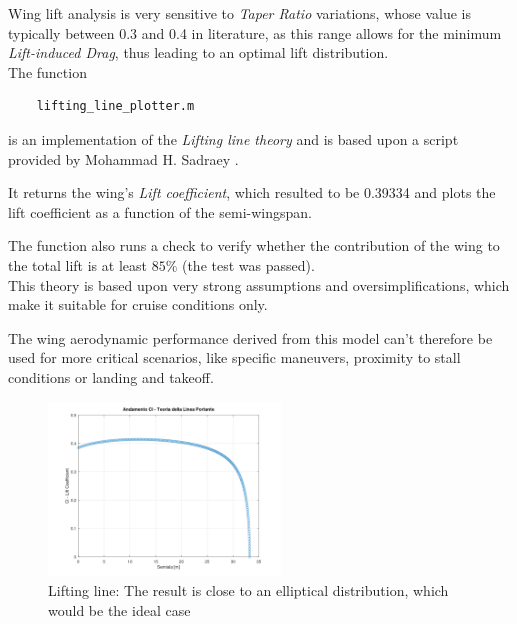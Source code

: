 \documentclass{article}
\begin{document}
Wing lift analysis is very sensitive to \textit{Taper Ratio} variations, whose value is typically between 
0.3 and 0.4 in literature, as this range allows for the minimum \textit{Lift-induced Drag}, thus leading to 
an optimal lift distribution. \\ 

The function \autocite{Airbus_replacement_repo}

\begin{verbatim}
    lifting_line_plotter.m
\end{verbatim}

is an implementation of the \textit{Lifting line theory} and is based upon a script provided by Mohammad H. Sadraey \autocite{Sadraey_Mohammad}. 

It returns the wing's \textit{Lift coefficient}, which resulted to be 0.39334 and plots the lift coefficient as a function of the semi-wingspan.

The function also runs a check to verify whether the contribution of the wing to the total lift is at least $85 \%$ (the test was passed). \\ 

This theory is based upon very strong assumptions and oversimplifications, which make it suitable for cruise
conditions only. 

The wing aerodynamic performance derived from this model can't therefore be used for more critical scenarios, like
specific maneuvers, proximity to stall conditions or landing and takeoff. \\ 

\begin{figure}[h!]
    \centering
    \includegraphics[width=0.55\textwidth]{Sources/Plots_and_Pictures/Linea_Portante.png}
    \caption{Lifting line: The result is close to an elliptical distribution, which would be the ideal case}
    \label{lifting_line}
\end{figure}
\end{document}

